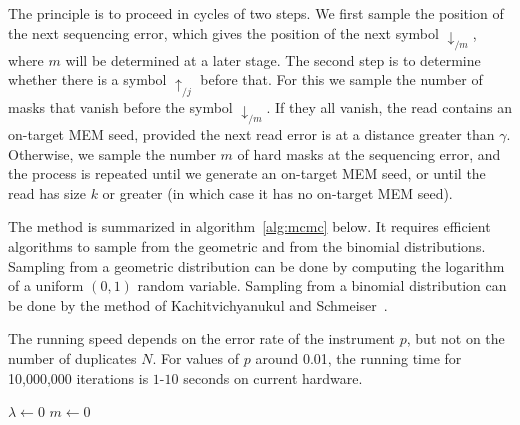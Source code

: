 \documentclass{article}
\begin{document}
The principle is to proceed in cycles of two steps. We first sample the
position of the next sequencing error, which gives the position of the
next symbol $\downarrow_{/m}$, where $m$ will be determined at a later
stage. The second step is to determine whether there is a symbol
$\uparrow_{/j}$ before that. For this we sample the number of masks that
vanish before the symbol $\downarrow_{/m}$. If they all vanish, the read
contains an on-target MEM seed, provided the next read error is at a
distance greater than $\gamma$. Otherwise, we sample the number $m$ of
hard masks at the sequencing error, and the process is repeated until we
generate an on-target MEM seed, or until the read has size $k$ or greater
(in which case it has no on-target MEM seed).

The method is summarized in algorithm~\ref{alg:mcmc} below. It requires
efficient algorithms to sample from the geometric and from the binomial
distributions. Sampling from a geometric distribution can be done by
computing the logarithm of a uniform $(0,1)$ random variable. Sampling
from a binomial distribution can be done by the method of
Kachitvichyanukul and Schmeiser~\cite{kachitvichyanukul1988binomial}.

The running speed depends on the error rate of the instrument $p$, but not
on the number of duplicates $N$. For values of $p$ around 0.01,
the running time for 10,000,000 iterations is $1$-$10$ seconds on current
hardware.

\begin{algorithm}[H]
\label{alg:mcmc}
\SetAlgoLined
{}
  $\lambda \leftarrow 0$ 
  $m \leftarrow 0$ 
\end{algorithm}
\end{document}
